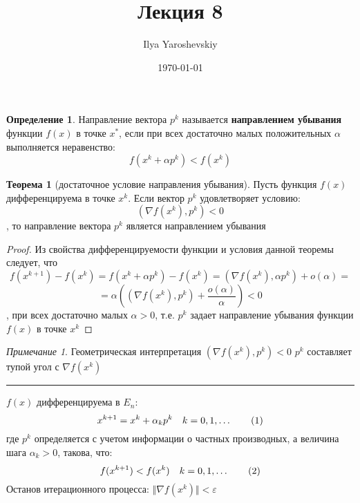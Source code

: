 \documentclass[english]{article}
\author{Ilya Yaroshevskiy}
\date{\today}
\title{Лекция 8}
\newcommand\addtag{\refstepcounter{equation}\tag{\theequation}}
\theoremstyle{plain}
\theoremstyle{remark}
\newtheorem*{remark}{Примечание}
\theoremstyle{definition}
\newtheorem{theorem}{Теорема}[section]
\newtheorem*{definition}{Определение}
\begin{document}
\maketitle
\tableofcontents

\begin{definition}
Направление вектора \(p^k\) называется \textbf{направлением убывания} функции \(f(x)\) в точке \(x^*\), если при всех достаточно малых положительных \(\alpha\) выполняется неравенство: \[f(x^k + \alpha p^k)  < f(x^k)\]
\end{definition}
\begin{theorem}[достаточное условие направления убывания]
Пусть функция \(f(x)\) дифференцируема в точке \(x^k\). Если вектор \(p^k\) удовлетворяет условию:
\[ (\nabla f(x^k), p^k) < 0 \]
, то направление вектора \(p^k\) является направлением убывания
\end{theorem}
\begin{proof}
Из свойства дифференцируемости функции и условия данной теоремы следует, что \[f(x^{k + 1}) - f(x^k) = f(x^k + \alpha p^k) - f(x^k) = (\nabla f(x^k), \alpha p^k) + o(\alpha) = \]
\[ = \alpha \left((\nabla f(x^k), p^k) + \frac{o(\alpha)}{\alpha}\right) < 0 \]
, при всех достаточно малых \(\alpha > 0\), т.е. \(p^k\) задает направление убывания функции \(f(x)\) в точке \(x^k\)
\end{proof}
\begin{remark}
Геометрическая интерпретация \((\nabla f(x^k), p^k) < 0\) \implies \(p^k\) составляет тупой угол с \(\nabla f(x^k)\)
\end{remark}

\noindent\rule{\textwidth}{0.5pt}
\(f(x)\) дифференцируема в \(E_n\):
\[ x^{k + 1} = x^k + \alpha_k p^k \quad k = 0,1,\dots \addtag\label{11_8}\]
где \(p^k\) определяется с учетом информации о частных производных, а величина шага \(\alpha_k > 0\), такова, что:
\[ f(x^{k + 1}) < f(x^k) \quad k = 0,1,\dots \addtag\label{12_8}\]
Останов итерационного процесса: \(\Vert \nabla f(x^k) \Vert < \varepsilon\)
\end{document}
